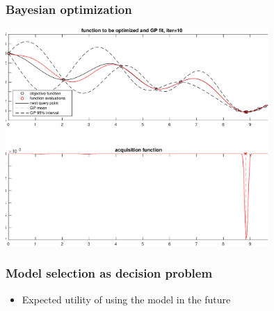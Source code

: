 \documentclass[10pt,handout]{beamer}
\begin{document}
\begin{frame}

\frametitle{Bayesian optimization}

    \includegraphics[width=10cm]{figs/bayesopt_1d_regular_iter10-crop.pdf}

\end{frame}

\begin{frame}

\frametitle{Model selection as decision problem}

  \begin{itemize}
  \item Expected utility of using the model in the future
  \end{itemize}

\end{frame}



\end{document}

